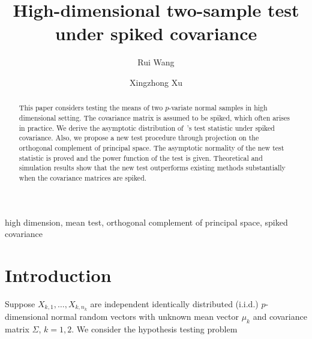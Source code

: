 \documentclass[review]{elsarticle}
\theoremstyle{plain}
\theoremstyle{definition}
\theoremstyle{remark}
\begin{document}
\begin{frontmatter}

\title{High-dimensional two-sample test under spiked covariance}

    \author[mymainaddress]{Rui Wang}
    \author[mymainaddress,mysecondaryaddress]{Xingzhong Xu}
    \address[mymainaddress]{School of Mathematics and Statistics, Beijing Institute of Technology, Beijing 
    100081,China}
    \address[mysecondaryaddress]{Beijing Key Laboratory on MCAACI, Beijing Institute of Technology, Beijing 100081,China}




\begin{abstract}
    This paper considers testing the means of two $p$-variate normal samples in high dimensional setting.
    The covariance matrix is assumed to be spiked, which often arises in practice. 
    We derive the asymptotic distribution of~\cite{Chen2010A}'s test statistic under spiked covariance.
    Also, we propose a new test procedure through projection on the orthogonal complement of principal space.
    The asymptotic normality of the new test statistic is proved and the power function of the test is given.
    Theoretical and simulation results show that the new test outperforms existing methods substantially when the covariance matrices are spiked.
\end{abstract}

\begin{keyword}
    high dimension, mean test, orthogonal complement of principal space, spiked covariance
\end{keyword}

\end{frontmatter}




\section{Introduction}

Suppose $X_{k,1},\ldots,X_{k,n_k}$  are independent identically distributed (i.i.d.) $p$-dimensional normal random vectors with unknown mean vector $\mu_k$ and covariance matrix $\Sigma$, $k=1,2$. We consider the hypothesis testing problem
\end{document}
